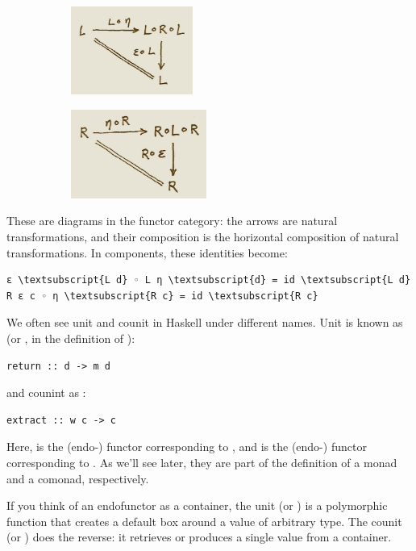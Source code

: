 \begin{figure}[H]
  \centering

  \begin{subfigure}
    \centering
    \includegraphics[width=40mm]{images/triangles.png}
  \end{subfigure}%
  \begin{subfigure}
    \centering
    \includegraphics[width=44.5mm]{images/triangles-2.png}
  \end{subfigure}
\end{figure}

\noindent
These are diagrams in the functor category: the arrows are natural
transformations, and their composition is the horizontal composition of
natural transformations. In components, these identities become:

\begin{Verbatim}[commandchars=\\\{\}]
ε \textsubscript{L d} ◦ L η \textsubscript{d} = id \textsubscript{L d}
R ε c ◦ η \textsubscript{R c} = id \textsubscript{R c}
\end{Verbatim}
We often see unit and counit in Haskell under different names. Unit is
known as  (or , in the definition of
):

\begin{verbatim}
return :: d -> m d
\end{verbatim}
and counint as :

\begin{verbatim}
extract :: w c -> c
\end{verbatim}
Here,  is the (endo-) functor corresponding to ,
and  is the (endo-) functor corresponding to . As
we'll see later, they are part of the definition of a monad and a
comonad, respectively.

If you think of an endofunctor as a container, the unit (or
) is a polymorphic function that creates a default box
around a value of arbitrary type. The counit (or ) does
the reverse: it retrieves or produces a single value from a container.

